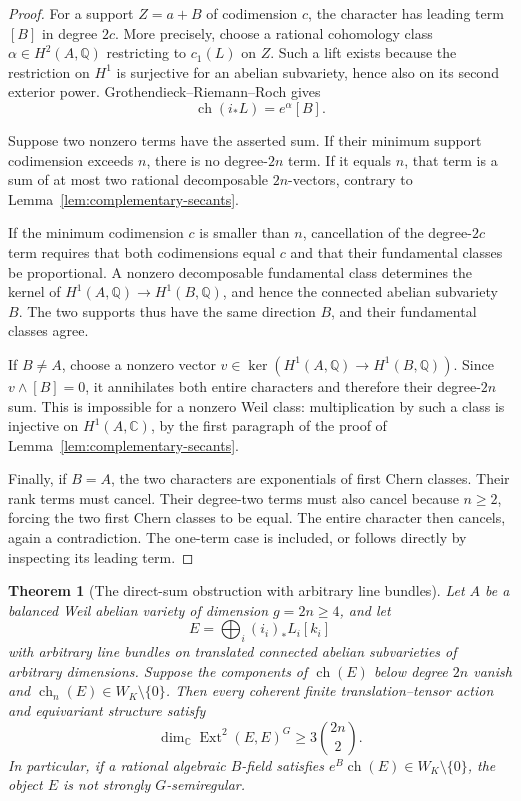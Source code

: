 \documentclass[11pt]{article}
\newtheorem{theorem}{Theorem}[section]
\theoremstyle{definition}
\theoremstyle{remark}
\begin{document}
\begin{proof}
For a support $Z=a+B$ of codimension $c$, the character has leading
term $[B]$ in degree $2c$.  More precisely, choose a rational
cohomology class $\alpha\in H^2(A,\mathbb Q)$ restricting to
$c_1(L)$ on $Z$.  Such a lift exists because the restriction on
$H^1$ is surjective for an abelian subvariety, hence also on its
second exterior power.  Grothendieck--Riemann--Roch gives
\[
 \operatorname{ch}(i_*L)=e^\alpha[B].
\]

Suppose two nonzero terms have the asserted sum.  If their minimum
support codimension exceeds $n$, there is no degree-$2n$ term.
If it equals $n$, that term is a sum of at most two rational
decomposable $2n$-vectors, contrary to
Lemma~\ref{lem:complementary-secants}.

If the minimum codimension $c$ is smaller than $n$, cancellation
of the degree-$2c$ term requires that both codimensions equal $c$
and that their fundamental classes be proportional.  A nonzero
decomposable fundamental class determines the kernel of
$H^1(A,\mathbb Q)\to H^1(B,\mathbb Q)$, and hence the connected
abelian subvariety $B$.  The two supports thus have the same
direction $B$, and their fundamental classes agree.

If $B\ne A$, choose a nonzero vector
$v\in\ker(H^1(A,\mathbb Q)\to H^1(B,\mathbb Q))$.
Since $v\wedge[B]=0$, it annihilates both entire characters and
therefore their degree-$2n$ sum.  This is impossible for a nonzero
Weil class: multiplication by such a class is injective on
$H^1(A,\mathbb C)$, by the first paragraph of the proof of
Lemma~\ref{lem:complementary-secants}.

Finally, if $B=A$, the two characters are exponentials of first
Chern classes.  Their rank terms must cancel.  Their degree-two
terms must also cancel because $n\geq2$, forcing the two first
Chern classes to be equal.  The entire character then cancels,
again a contradiction.  The one-term case is included, or follows
directly by inspecting its leading term.
\end{proof}

\begin{theorem}[The direct-sum obstruction with arbitrary line bundles]
\label{thm:all-line-subtorus-sums}
Let $A$ be a balanced Weil abelian variety of dimension $g=2n\geq4$,
and let
\[
 E=\bigoplus_i(i_i)_*L_i[k_i]
\]
with arbitrary line bundles on translated connected abelian
subvarieties of arbitrary dimensions.  Suppose the components
of $\operatorname{ch}(E)$ below degree $2n$ vanish and
$\operatorname{ch}_n(E)\in W_K\setminus\{0\}$.
Then every coherent finite translation--tensor action and
equivariant structure satisfy
\[
 \dim_{\mathbb C}\operatorname{Ext}^2(E,E)^G
       \geq3\binom{2n}{2}.
\]
In particular, if a rational algebraic $B$-field satisfies
$e^B\operatorname{ch}(E)\in W_K\setminus\{0\}$, the object
$E$ is not strongly $G$-semiregular.
\end{theorem}
\end{document}
